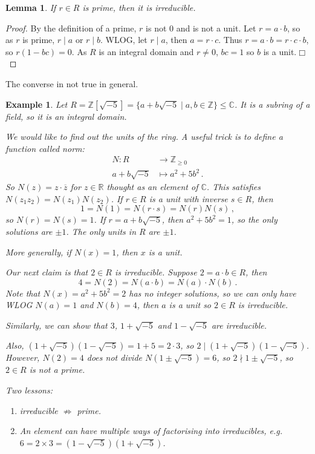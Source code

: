 \documentclass{article}
\theoremstyle{plain}\theoremheaderfont{\normalfont\itshape}\theorembodyfont{\rmfamily}\theoremseparator{.}\newtheorem*{rem}{Remark}\newtheorem*{ex}{Example}\newtheorem*{proof}{Proof}\newtheorem*{altp}{Alternative proof}\newtheorem*{nonex}{Non-Example}
\theoremstyle{plain}\theoremheaderfont{\normalfont\bfseries}\theorembodyfont{\rmfamily}\theoremseparator{.}\newtheorem{thm}{Theorem}[section]\newtheorem{lem}[thm]{Lemma}\newtheorem{prop}[thm]{Proposition}\newtheorem*{cor}{Corollary}\newtheorem{defn}[thm]{Definition}\newtheorem{clm}[thm]{Claim}\newtheorem{clminproof}{Claim}\newtheorem*{notn}{Notation}\newtheorem*{exer}{Exercise}\newtheorem*{lemnn}{Lemma}
\theoremstyle{break}\theoremheaderfont{\normalfont\itshape}\theorembodyfont{\rmfamily}\theoremseparator{.\medskip}\newtheorem*{proofskip}{Proof}\newtheorem*{exs}{Examples}\newtheorem*{rems}{Remarks}\newtheorem*{obs}{Observations}
\theoremstyle{break}\theoremheaderfont{\normalfont\bfseries}\theorembodyfont{\rmfamily}\theoremseparator{.\medskip}\newtheorem{lemskip}[thm]{Lemma}\newtheorem{defnskip}[thm]{Definition}\newtheorem{propskip}[thm]{Proposition}\newtheorem{thmskip}[thm]{Theorem}
\numberwithin{equation}{section}
\newcommand{\qed}{\hfill\ensuremath{\Box}}
\newcommand{\ZZ}{\mathbb{Z}}
\newcommand{\RR}{\mathbb{R}}
\newcommand{\CC}{\mathbb{C}}
\begin{document}
    \begin{lem}
        If \(r\in R\) is prime, then it is irreducible.
    \end{lem}
    \begin{proof}
        By the definition of a prime, \(r\) is not 0 and is not a unit. Let \(r=a\cdot b\), so as \(r\) is prime, \(r\mid a\) or \(r\mid b\). WLOG, let \(r\mid a\), then \(a=r\cdot c\). Thus \(r=a\cdot b=r\cdot c\cdot b\), so \(r(1-bc)=0\). As \(R\) is an integral domain and \(r\ne 0\), \(bc=1\) so \(b\) is a unit.\qed
    \end{proof}
    The converse in not true in general.
    \begin{ex}
        Let \(R=\ZZ[\sqrt{-5}]=\{a+b\sqrt{-5}\mid a,b\in\ZZ\}\le\CC\). It is a subring of a field, so it is an integral domain.
        
        We would like to find out the units of the ring. A useful trick is to define a function called norm:
        \begin{align*}
            N:R&\longrightarrow\ZZ_{\ge 0}\\
            a+b\sqrt{-5}&\longmapsto a^2+5b^2\,.
        \end{align*}
        So \(N(z)=z\cdot\overline{z}\) for \(z\in\RR\) thought as an element of \(\CC\). This satisfies \(N(z_1z_2)=N(z_1)N(z_2)\). If \(r\in R\) is a unit with inverse \(s\in R\), then
        \[1=N(1)=N(r\cdot s)=N(r)N(s)\,,\]
        so \(N(r)=N(s)=1\). If \(r=a+b\sqrt{-5}\), then \(a^2+5b^2=1\), so the only solutions are \(\pm 1\). The only units in \(R\) are \(\pm 1\).

        More generally, if \(N(x)=1\), then \(x\) is a unit.

        Our next claim is that \(2\in R\) is irreducible. Suppose \(2=a\cdot b\in R\), then
        \[4=N(2)=N(a\cdot b)=N(a)\cdot N(b)\,.\]
        Note that \(N(x)=a^2+5b^2=2\) has no integer solutions, so we can only have WLOG \(N(a)=1\) and \(N(b)=4\), then \(a\) is a unit so \(2\in R\) is irreducible.

        Similarly, we can show that \(3\), \(1+\sqrt{-5}\) and \(1-\sqrt{-5}\) are irreducible.

        Also, \((1+\sqrt{-5})(1-\sqrt{-5})=1+5=2\cdot 3\), so \(2\mid (1+\sqrt{-5})(1-\sqrt{-5})\). However, \(N(2)=4\) does not divide \(N(1\pm\sqrt{-5})=6\), so \(2\nmid 1\pm\sqrt{-5}\), so \(2\in R\) is not a prime.

        Two lessons:
        \begin{enumerate}[topsep=0pt,label=(\roman*)]
            \item irreducible \(\nRightarrow\) prime.
            \item An element can have multiple ways of factorising into irreducibles, e.g. \(6=2\times 3=(1-\sqrt{-5})(1+\sqrt{-5})\).
        \end{enumerate}
    \end{ex}
\end{document}
